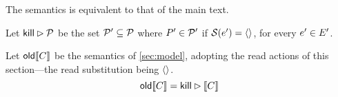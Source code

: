 The semantics is equivalent to that of the main text.

Let $\mathsf{kill}\mathbin\rhd\mathcal{P}$ be the set $\mathcal{P}'\subseteq\mathcal{P}$ where $P'\in\mathcal{P}'$
if $\mathcal{S}(e')=\langle\rangle$, for every $e'\in E'$.

\begin{proposition}
  \label{thm:seq}
  Let $\semold{\aCmd}$ be the semantics of \textsection\ref{sec:model},
  adopting the read actions of this section---the read substitution
  being $\langle\rangle$.
\begin{displaymath}
  \semold{\aCmd} = \killS\sem{\aCmd}
\end{displaymath}
\end{proposition}
 
